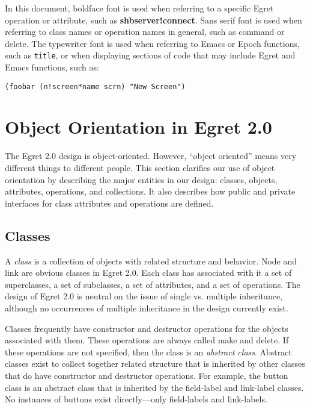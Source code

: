 In this document, boldface font is used when referring to a specific Egret 
operation or attribute, such as {\bf s\STAR hbserver!connect}.  Sans serif 
font is used when referring to class names or operation names in general, 
such as {\sf command} or {\sf delete}.  The typewriter font is used when
referring to Emacs or Epoch functions, such as {\tt title}, or when 
displaying sections of code that may include Egret and Emacs functions, such
as:
\small\begin{verbatim}
(foobar (n!screen*name scrn) "New Screen")
\end{verbatim}\normalsize


\section{Object Orientation in Egret 2.0}

The Egret 2.0 design is object-oriented.  However, ``object oriented''
means very different things to different people.  This section
clarifies our use of object orientation by describing the major
entities in our design: classes, objects, attributes, operations, and
collections.  It also describes how public and private interfaces for
class attributes and operations are defined.


\subsection{Classes}  

A {\em class}\/ is a collection of objects with related structure and
behavior.  {\sf Node} and {\sf link} are obvious classes in Egret 2.0.
Each class has associated with it a set of superclasses, a
set of subclasses, a set of attributes, and a set of operations.  The
design of Egret 2.0 is  neutral on the issue of single vs. 
multiple inheritance, although no occurrences of multiple inheritance
in the design currently exist.

Classes frequently have constructor and destructor operations for the objects
associated with them.  These operations are always called {\sf make}
and {\sf delete}. If these operations are not specified, then the class is an 
{\em abstract class}. Abstract classes exist to collect together related
structure that is inherited by other classes that do have constructor
and destructor operations.  For example, the {\sf button} class is an
abstract class that is inherited by the {\sf field-label} and {\sf
link-label} classes. No instances of buttons exist directly---only
field-labels and link-labels.

